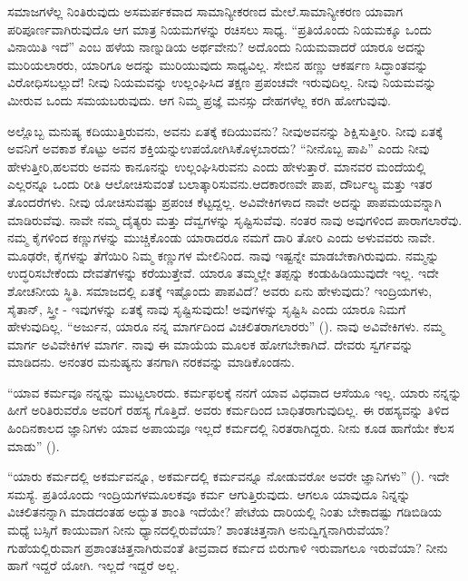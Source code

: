 ಸಮಾಜಗಳೆಲ್ಲ ನಿಂತಿರುವುದು ಅಸಮರ್ಪಕವಾದ ಸಾಮಾನ್ಯೀಕರಣದ ಮೇಲೆ.\break ಸಾಮಾನ್ಯೀಕರಣ ಯಾವಾಗ ಪರಿಪೂರ್ಣವಾಗಿರುವುದೊ ಆಗ ಮಾತ್ರ ನಿಯಮಗಳನ್ನು ರಚಿಸಲು ಸಾಧ್ಯ. “ಪ್ರತಿಯೊಂದು ನಿಯಮಕ್ಕೂ ಒಂದು ವಿನಾಯಿತಿ ಇದೆ” ಎಂಬ ಹಳೆಯ ನಾಣ್ನುಡಿಯ ಅರ್ಥವೇನು? ಅದೊಂದು ನಿಯಮವಾದರೆ ಯಾರೂ ಅದನ್ನು ಮುರಿಯಲಾರರು, ಯಾರಿಗೂ ಅದನ್ನು ಮುರಿಯುವುದು ಸಾಧ್ಯವಿಲ್ಲ. ಸೇಬಿನ ಹಣ್ಣು ಆಕರ್ಷಣ ಸಿದ್ಧಾಂತವನ್ನು ವಿರೋಧಿಸಬಲ್ಲುದೆ! ನೀವು ನಿಯಮವನ್ನು ಉಲ್ಲಂಘಿಸಿದ ತಕ್ಷಣ ಪ್ರಪಂಚವೇ ಇರುವುದಿಲ್ಲ. ನೀವು ನಿಯಮವನ್ನು ಮೀರುವ ಒಂದು ಸಮಯ\break ಬರುವುದು. ಆಗ ನಿಮ್ಮ ಪ್ರಜ್ಞೆ ಮನಸ್ಸು ದೇಹಗಳೆಲ್ಲ ಕರಗಿ ಹೋಗುವುವು.

ಅಲ್ಲೊಬ್ಬ ಮನುಷ್ಯ ಕದಿಯುತ್ತಿರುವನು, ಅವನು ಏತಕ್ಕೆ ಕದಿಯುವನು? ನೀವು\break ಅವನನ್ನು ಶಿಕ್ಷಿಸುತ್ತೀರಿ. ನೀವು ಏತಕ್ಕೆ ಅವನಿಗೆ ಅವಕಾಶ ಕೊಟ್ಟು ಅವನ ಶಕ್ತಿಯನ್ನು\break ಉಪಯೋಗಿಸಿಕೊಳ್ಳಬಾರದು? “ನೀನೊಬ್ಬ ಪಾಪಿ” ಎಂದು ನೀವು ಹೇಳುತ್ತೀರಿ,\break ಹಲವರು ಅವನು ಕಾನೂನನ್ನು ಉಲ್ಲಂಘಿಸಿರುವನು ಎಂದು ಹೇಳುತ್ತಾರೆ. ಮಾನವರ ಮಂದೆಯಲ್ಲಿ ಎಲ್ಲರನ್ನೂ ಒಂದು ರೀತಿ ಆಲೋಚಿಸುವಂತೆ ಬಲಾತ್ಕಾರಿಸುವನು.\break ಆದಕಾರಣವೇ ಪಾಪ, ದೌರ್ಬಲ್ಯ ಮತ್ತು ಇತರ ತೊಂದರೆಗಳು. ನೀವು ಯೋಚಿಸುವಷ್ಟು ಪ್ರಪಂಚ ಕೆಟ್ಟದ್ದಲ್ಲ. ಅವಿವೇಕಿಗಳಾದ ನಾವೇ ಅದನ್ನು ಪಾಪಮಯವನ್ನಾಗಿ ಮಾಡಿರುವೆವು. ನಾವೇ ನಮ್ಮ ದೈತ್ಯರು ಮತ್ತು ದೆವ್ವಗಳನ್ನು ಸೃಷ್ಟಿಸುವೆವು. ನಂತರ ನಾವು ಅವುಗಳಿಂದ ಪಾರಾಗಲಾರೆವು. ನಮ್ಮ ಕೈಗಳಿಂದ ಕಣ್ಣುಗಳನ್ನು ಮುಚ್ಚಿಕೊಂಡು ಯಾರಾದರೂ ನಮಗೆ ದಾರಿ ತೋರಿ ಎಂದು ಅಳುವವರು ನಾವೇ. ಮೂಢರೇ, ಕೈಗಳನ್ನು ತೆಗೆಯಿರಿ ನಿಮ್ಮ ಕಣ್ಣುಗಳ ಮೇಲಿನಿಂದ. ನಾವು ಇಷ್ಟನ್ನೇ ಮಾಡಬೇಕಾಗಿರುವುದು. ನಮ್ಮನ್ನು ಉದ್ಧರಿಸಬೇಕೆಂದು ದೇವತೆಗಳನ್ನು ಕರೆಯುತ್ತೇವೆ. ಯಾರೂ ತಮ್ಮಲ್ಲೇ ತಪ್ಪನ್ನು ಕಂಡುಹಿಡಿಯುವುದೇ ಇಲ್ಲ. ಇದೇ ಶೋಚನೀಯ ಸ್ಥಿತಿ. ಸಮಾಜದಲ್ಲಿ ಏತಕ್ಕೆ ಇಷ್ಟೊಂದು ಪಾಪವಿದೆ? ಅವರು ಏನು ಹೇಳುವುದು? ಇಂದ್ರಿಯಗಳು, ಸೈತಾನ್​, ಸ್ತ್ರೀ - ಇವುಗಳನ್ನು ಏತಕ್ಕೆ ನಾವು ಸೃಷ್ಟಿಸುವುದು! ಅವುಗಳನ್ನು ಸೃಷ್ಟಿಸಿ ಎಂದು ಯಾರೂ ನಿಮಗೆ ಹೇಳುವುದಿಲ್ಲ. “ಅರ್ಜುನ, ಯಾರೂ ನನ್ನ ಮಾರ್ಗದಿಂದ ವಿಚಲಿತರಾಗಲಾರರು” (). ನಾವು ಅವಿವೇಕಿಗಳು. ನಮ್ಮ ಮಾರ್ಗ ಅವಿವೇಕಿಗಳ ಮಾರ್ಗ. ನಾವು ಈ ಮಾಯೆಯ ಮೂಲಕ ಹೋಗಬೇಕಾಗಿದೆ. ದೇವರು ಸ್ವರ್ಗವನ್ನು ಮಾಡಿದನು. ಅನಂತರ ಮನುಷ್ಯನು ತನಗಾಗಿ ನರಕವನ್ನು ಮಾಡಿಕೊಂಡನು.

“ಯಾವ ಕರ್ಮವೂ ನನ್ನನ್ನು ಮುಟ್ಟಲಾರದು. ಕರ್ಮಫಲಕ್ಕೆ ನನಗೆ ಯಾವ ವಿಧವಾದ ಆಸೆಯೂ ಇಲ್ಲ. ಯಾರು ನನ್ನನ್ನು ಹೀಗೆ ಅರಿತಿರುವರೊ ಅವರಿಗೆ ರಹಸ್ಯ ಗೊತ್ತಿದೆ. ಅವರು ಕರ್ಮದಿಂದ ಬಾಧಿತರಾಗುವುದಿಲ್ಲ. ಈ ರಹಸ್ಯವನ್ನು ತಿಳಿದ ಹಿಂದಿನಕಾಲದ ಜ್ಞಾನಿಗಳು ಯಾವ ಅಪಾಯವೂ ಇಲ್ಲದೆ ಕರ್ಮದಲ್ಲಿ ನಿರತರಾಗಿದ್ದರು. ನೀನು ಕೂಡ ಹಾಗೆಯೇ ಕೆಲಸ ಮಾಡು” ().

“ಯಾರು ಕರ್ಮದಲ್ಲಿ ಅಕರ್ಮವನ್ನೂ, ಅಕರ್ಮದಲ್ಲಿ ಕರ್ಮವನ್ನೂ ನೋಡುವರೋ ಅವರೇ ಜ್ಞಾನಿಗಳು” (). ಇದೇ ಸಮಸ್ಯೆ. ಪ್ರತಿಯೊಂದು ಇಂದ್ರಿಯಗಳ\break ಮೂಲಕವೂ ಕರ್ಮ ಆಗುತ್ತಿರುವುದು. ಆಗಲೂ ಯಾವುದೂ ನಿನ್ನನ್ನು ವಿಚಲಿತನನ್ನಾಗಿ ಮಾಡದಂತಹ ಅದ್ಭುತ ಶಾಂತಿ ಇದೆಯೇ? ಪೇಟೆಯ ದಾರಿಯಲ್ಲಿ ನಿಂತು ಬೇಕಾದಷ್ಟು ಗಡಿಬಿಡಿಯ ಮಧ್ಯೆ ಬಸ್ಸಿಗೆ ಕಾಯುವಾಗ ನೀನು ಧ್ಯಾನದಲ್ಲಿರುವೆಯಾ? ಶಾಂತಚಿತ್ತನಾಗಿ ಅನುದ್ವಿಗ್ನನಾಗಿರುವೆಯಾ? ಗುಹೆಯಲ್ಲಿರುವಾಗ ಪ್ರಶಾಂತಚಿತ್ತನಾಗಿರುವಂತೆ ತೀವ್ರವಾದ ಕರ್ಮದ ಬಿರುಗಾಳಿ ಇರುವಾಗಲೂ ಇರುವೆಯಾ? ನೀನು ಹಾಗೆ ಇದ್ದರೆ ಯೋಗಿ. ಇಲ್ಲದೆ ಇದ್ದರೆ ಅಲ್ಲ.

